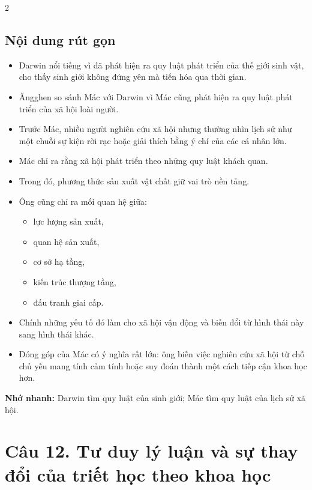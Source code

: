 \documentclass[9pt,a4paper]{extarticle}
\begin{document}
\begin{multicols*}{2}
\subsection*{Nội dung rút gọn}
\begin{itemize}
  \item Darwin nổi tiếng vì đã phát hiện ra quy luật phát triển của thế giới sinh vật, cho thấy sinh giới không đứng yên mà tiến hóa qua thời gian.
  \item Ăngghen so sánh Mác với Darwin vì Mác cũng phát hiện ra quy luật phát triển của xã hội loài người.
  \item Trước Mác, nhiều người nghiên cứu xã hội nhưng thường nhìn lịch sử như một chuỗi sự kiện rời rạc hoặc giải thích bằng ý chí của các cá nhân lớn.
  \item Mác chỉ ra rằng xã hội phát triển theo những quy luật khách quan.
  \item Trong đó, phương thức sản xuất vật chất giữ vai trò nền tảng.
  \item Ông cũng chỉ ra mối quan hệ giữa:
  \begin{itemize}
    \item lực lượng sản xuất,
    \item quan hệ sản xuất,
    \item cơ sở hạ tầng,
    \item kiến trúc thượng tầng,
    \item đấu tranh giai cấp.
  \end{itemize}
  \item Chính những yếu tố đó làm cho xã hội vận động và biến đổi từ hình thái này sang hình thái khác.
  \item Đóng góp của Mác có ý nghĩa rất lớn: ông biến việc nghiên cứu xã hội từ chỗ chủ yếu mang tính cảm tính hoặc suy đoán thành một cách tiếp cận khoa học hơn.
\end{itemize}

\textbf{Nhớ nhanh:} Darwin tìm quy luật của sinh giới; Mác tìm quy luật của lịch sử xã hội.

\section*{Câu 12. Tư duy lý luận và sự thay đổi của triết học theo khoa học}

\end{multicols*}
\end{document}
